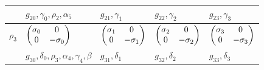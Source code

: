 \documentclass[handout,10pt]{beamer}
\begin{document}
\begin{frame}[shrink=20]{}
\begin{table}[]
\begin{tabular}{l l  l  l  l }
\\
&  $g_{20}, \gamma_0, \rho_2, \alpha_5$ & $g_{21}, \gamma_1$  & $g_{22}, \gamma_2$ & $g_{23}, \gamma_3$ \\
\hline
$\rho_3$ 
& $\begin{pmatrix}\sigma_0 & 0\cr 0 & -\sigma_0\end{pmatrix}$  
& $\begin{pmatrix}\sigma_1 & 0\cr 0 & -\sigma_1\end{pmatrix}$ 
& $\begin{pmatrix}\sigma_2 & 0\cr 0 & -\sigma_2\end{pmatrix}$ 
& $\begin{pmatrix}\sigma_3 & 0\cr 0 & -\sigma_3\end{pmatrix}$
\\
 &$g_{30}, \delta_0, \rho_3, \alpha_4, \gamma_4 , \beta$ & $g_{31}, \delta_1$  & $g_{32}, \delta_2$ & $g_{33}, \delta_3$ \\
\hline
\end{tabular}
\end{table}

\end{frame}
\end{document}

